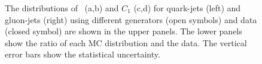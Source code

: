 \begin{figure}[htb]
	\caption[]{
		The distributions of \wtrk~(a,b) and $C_1$ (c,d) for quark-jets (left) and gluon-jets (right) using different generators (open symbols) and data (closed symbol) are shown in the upper panels. The lower panels show the ratio of each MC distribution and the data. The vertical error bars show the statistical uncertainty.%
		\label{fig:QG-roc-com122}
	}
\end{figure}

\begin{figure}[htb]
	\centering
	 \quad
	\\
	 \quad

\end{figure}
